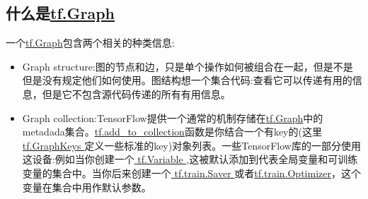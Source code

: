 \subsection{什么是\href{https://www.tensorflow.org/api_docs/python/tf/Graph?hl=zh-cn}{tf.Graph}}
一个\href{https://www.tensorflow.org/api_docs/python/tf/Graph?hl=zh-cn}{tf.Graph}包含两个相关的种类信息:
\begin{itemize}
\item Graph structure:图的节点和边，只是单个操作如何被组合在一起，但是不是但是没有规定他们如何使用。图结构想一个集合代码:查看它可以传递有用的信息，但是它不包含源代码传递的所有有用信息。
\item Graph collection:TensorFlow提供一个通常的机制存储在\href{https://www.tensorflow.org/api_docs/python/tf/Graph?hl=zh-cn}{tf.Graph}中的metadada集合。\href{https://www.tensorflow.org/api_docs/python/tf/add_to_collection?hl=zh-cn}{tf.add\_to\_collection}函数是你结合一个有key的(这里\href{https://www.tensorflow.org/api_docs/python/tf/GraphKeys?hl=zh-cn}{ tf.GraphKeys }定义一些标准的key)对象列表。一些TensorFlow库的一部分使用这设备:例如当你创建一个\href{https://www.tensorflow.org/api_docs/python/tf/Variable?hl=zh-cn}{ tf.Variable },这被默认添加到代表全局变量和可训练变量的集合中。当你后来创建一个\href{https://www.tensorflow.org/api_docs/python/tf/train/Saver?hl=zh-cn}{ tf.train.Saver }或者\href{https://www.tensorflow.org/api_docs/python/tf/train/Optimizer?hl=zh-cn}{tf.train.Optimizer}，这个变量在集合中用作默认参数。
\end{itemize}
